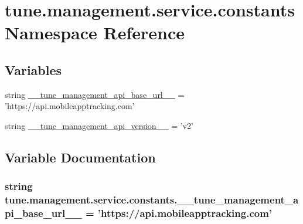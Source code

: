 \hypertarget{namespacetune_1_1management_1_1service_1_1constants}{\section{tune.\-management.\-service.\-constants Namespace Reference}
\label{namespacetune_1_1management_1_1service_1_1constants}
}
\subsection*{Variables}
\begin{DoxyCompactItemize}
\item 
string \hyperlink{namespacetune_1_1management_1_1service_1_1constants_ab14166d045e8e4f68dc043ad10f1e64a}{\-\_\-\-\_\-tune\-\_\-management\-\_\-api\-\_\-base\-\_\-url\-\_\-\-\_\-} = 'https\-://api.\-mobileapptracking.\-com'
\item 
string \hyperlink{namespacetune_1_1management_1_1service_1_1constants_ac90fb32e530083d3a7cff927d9553df8}{\-\_\-\-\_\-tune\-\_\-management\-\_\-api\-\_\-version\-\_\-\-\_\-} = 'v2'
\end{DoxyCompactItemize}


\subsection{Variable Documentation}
\hypertarget{namespacetune_1_1management_1_1service_1_1constants_ab14166d045e8e4f68dc043ad10f1e64a}{
\subsubsection[{\-\_\-\-\_\-tune\-\_\-management\-\_\-api\-\_\-base\-\_\-url\-\_\-\-\_\-}]{\setlength{\rightskip}{0pt plus 5cm}string tune.\-management.\-service.\-constants.\-\_\-\-\_\-tune\-\_\-management\-\_\-api\-\_\-base\-\_\-url\-\_\-\-\_\- = 'https\-://api.\-mobileapptracking.\-com'}}\label{namespacetune_1_1management_1_1service_1_1constants_ab14166d045e8e4f68dc043ad10f1e64a}


